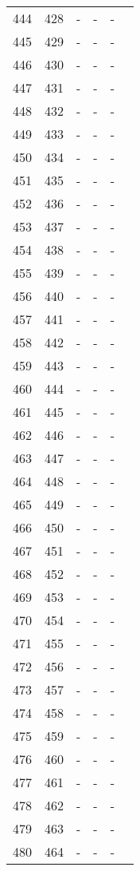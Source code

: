 \documentclass[10pt]{article}
\begin{document}
\begin{longtable}{llllll}
  444 & 428 & - & - & - &  \\ 
  445 & 429 & - & - & - &  \\ 
  446 & 430 & - & - & - &  \\ 
  447 & 431 & - & - & - &  \\ 
  448 & 432 & - & - & - &  \\ 
  449 & 433 & - & - & - &  \\ 
  450 & 434 & - & - & - &  \\ 
  451 & 435 & - & - & - &  \\ 
  452 & 436 & - & - & - &  \\ 
  453 & 437 & - & - & - &  \\ 
  454 & 438 & - & - & - &  \\ 
  455 & 439 & - & - & - &  \\ 
  456 & 440 & - & - & - &  \\ 
  457 & 441 & - & - & - &  \\ 
  458 & 442 & - & - & - &  \\ 
  459 & 443 & - & - & - &  \\ 
  460 & 444 & - & - & - &  \\ 
  461 & 445 & - & - & - &  \\ 
  462 & 446 & - & - & - &  \\ 
  463 & 447 & - & - & - &  \\ 
  464 & 448 & - & - & - &  \\ 
  465 & 449 & - & - & - &  \\ 
  466 & 450 & - & - & - &  \\ 
  467 & 451 & - & - & - &  \\ 
  468 & 452 & - & - & - &  \\ 
  469 & 453 & - & - & - &  \\ 
  470 & 454 & - & - & - &  \\ 
  471 & 455 & - & - & - &  \\ 
  472 & 456 & - & - & - &  \\ 
  473 & 457 & - & - & - &  \\ 
  474 & 458 & - & - & - &  \\ 
  475 & 459 & - & - & - &  \\ 
  476 & 460 & - & - & - &  \\ 
  477 & 461 & - & - & - &  \\ 
  478 & 462 & - & - & - &  \\ 
  479 & 463 & - & - & - &  \\ 
  480 & 464 & - & - & - &  \\ 

\end{longtable}
\end{document}
